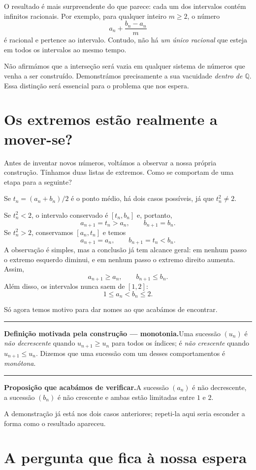 \documentclass[11pt,a4paper]{article}
\newcommand{\Q}{\mathbb{Q}}
\newcommand{\assentado}[2]{%
\par\medskip\noindent\begingroup\color{azul}\rule{\linewidth}{0.45pt}\par\smallskip
\noindent\textbf{#1.}\enspace #2\par\endgroup\medskip}
\begin{document}
O resultado é mais surpreendente do que parece: cada um dos intervalos contém infinitos racionais. Por exemplo, para qualquer inteiro $m\ge2$, o número
\[
a_n+\frac{b_n-a_n}{m}
\]
é racional e pertence ao intervalo. Contudo, não há \emph{um único racional} que esteja em todos os intervalos ao mesmo tempo.

Não afirmámos que a interseção será vazia em qualquer sistema de números que venha a ser construído. Demonstrámos precisamente a sua vacuidade \emph{dentro de $\Q$}. Essa distinção será essencial para o problema que nos espera.

\section{Os extremos estão realmente a mover-se?}

Antes de inventar novos números, voltámos a observar a nossa própria construção. Tínhamos duas listas de extremos. Como se comportam de uma etapa para a seguinte?

Se $t_n=(a_n+b_n)/2$ é o ponto médio, há dois casos possíveis, já que $t_n^2\ne2$.

Se $t_n^2<2$, o intervalo conservado é $[t_n,b_n]$ e, portanto,
\[
a_{n+1}=t_n>a_n,\qquad b_{n+1}=b_n.
\]
Se $t_n^2>2$, conservamos $[a_n,t_n]$ e temos
\[
a_{n+1}=a_n,\qquad b_{n+1}=t_n<b_n.
\]
A observação é simples, mas a conclusão já tem alcance geral: em nenhum passo o extremo esquerdo diminui, e em nenhum passo o extremo direito aumenta. Assim,
\[
\boxed{a_{n+1}\ge a_n},\qquad
\boxed{b_{n+1}\le b_n}.
\]
Além disso, os intervalos nunca saem de $[1,2]$:
\[
1\le a_n<b_n\le2.
\]

Só agora temos motivo para dar nomes ao que acabámos de encontrar.

\assentado{Definição motivada pela construção --- monotonia}{Uma sucessão $(u_n)$ é \emph{não decrescente} quando $u_{n+1}\ge u_n$ para todos os índices; é \emph{não crescente} quando $u_{n+1}\le u_n$. Dizemos que uma sucessão com um desses comportamentos é \emph{monótona}.}

\assentado{Proposição que acabámos de verificar}{A sucessão $(a_n)$ é não decrescente, a sucessão $(b_n)$ é não crescente e ambas estão limitadas entre $1$ e $2$.}

A demonstração já está nos dois casos anteriores; repeti-la aqui seria esconder a forma como o resultado apareceu.

\section{A pergunta que fica à nossa espera}
\end{document}
